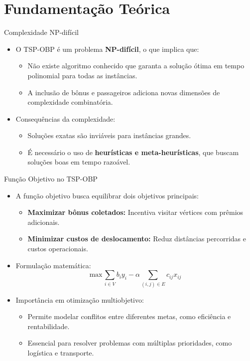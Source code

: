 \documentclass[aspectratio=169,xcolor=table]{beamer}
\begin{document}
\section{Fundamentação Teórica}


\begin{frame}{Complexidade NP-difícil}
    \begin{itemize}
        \item O TSP-OBP é um problema \textbf{NP-difícil}, o que implica que:
        \begin{itemize}
            \item Não existe algoritmo conhecido que garanta a solução ótima em tempo polinomial para todas as instâncias.
            \item A inclusão de bônus e passageiros adiciona novas dimensões de complexidade combinatória.
        \end{itemize}
        \item Consequências da complexidade:
        \begin{itemize}
            \item Soluções exatas são inviáveis para instâncias grandes.
            \item É necessário o uso de \textbf{heurísticas e meta-heurísticas}, que buscam soluções boas em tempo razoável.
        \end{itemize}
    \end{itemize}
\end{frame}

\begin{frame}{Função Objetivo no TSP-OBP}
    \begin{itemize}
        \item A função objetivo busca equilibrar dois objetivos principais:
        \begin{itemize}
            \item \textbf{Maximizar bônus coletados:} Incentiva visitar vértices com prêmios adicionais.
            \item \textbf{Minimizar custos de deslocamento:} Reduz distâncias percorridas e custos operacionais.
        \end{itemize}
        \item Formulação matemática:
        \[
        \text{max} \, \sum_{i \in V} b_i y_i - \alpha \sum_{(i,j) \in E} c_{ij} x_{ij}
        \]
        \item Importância em otimização multiobjetivo:
        \begin{itemize}
            \item Permite modelar conflitos entre diferentes metas, como eficiência e rentabilidade.
            \item Essencial para resolver problemas com múltiplas prioridades, como logística e transporte.
        \end{itemize}
    \end{itemize}
\end{frame}
\end{document}
